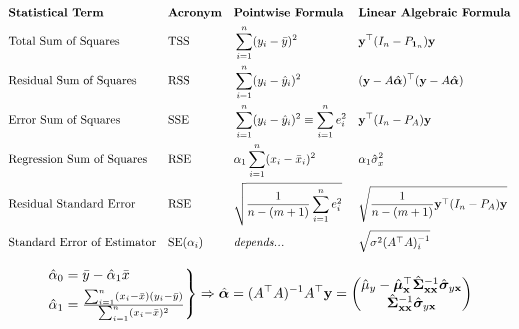 \documentclass[12pt, twoside, draft]{article}
\begin{document}
\begin{align}
& \textbf{Statistical Term} && \textbf{Acronym} && \textbf{Pointwise Formula} && \textbf{Linear Algebraic Formula} \notag\\
&\text{Total Sum of Squares} && \text{TSS} && \sum_{i=1}^n (y_i - \bar{y})^2 && \mathbf{y}^\top (I_n - P_{\mathbf{1}_n}) \mathbf{y} \\
&\text{Residual Sum of Squares} && \text{RSS} && \sum_{i=1}^n (y_i - \hat{y}_i)^2 && (\mathbf{y} - A\hat{\boldsymbol{\alpha}})^\top (\mathbf{y} - A\hat{\boldsymbol{\alpha}}) \\
&\text{Error Sum of Squares} && \text{SSE} && \sum_{i=1}^n (y_i - \hat{y}_i)^2 \equiv \sum_{i=1}^n e^2_i && \mathbf{y}^\top (I_n - P_{A}) \mathbf{y} \\
&\text{Regression Sum of Squares} && \text{RSE} && \alpha_1 \sum_{i=1}^n (x_i - \bar{x}_i)^2  &&  \alpha_1 \hat{\sigma}_x^2 \\
&\text{Residual Standard Error} && \text{RSE} && \sqrt{\frac{1}{n-(m+1)} \sum_{i=1}^n e_i^2 }&&  \sqrt{\frac{1}{n-(m+1)} \mathbf{y}^\top (I_n - P_{A}) \mathbf{y}} \\
&\text{Standard Error of Estimator} && \text{SE}(\alpha_i) && \textit{depends...} &&  \sqrt{\sigma^2 (A^\top A)^{-1}_i}
\end{align}





\begin{equation}
\begin{rcases}
\hat{\alpha}_0 = \bar{y} - \hat{\alpha}_1 \bar{x} \\
\hat{\alpha}_1 = \frac{\sum_{i=1}^n (x_i - \bar{x})(y_i - \bar{y})}{\sum_{i=1}^n (x_i - \bar{x})^2}
\end{rcases} \Rightarrow \hat{\boldsymbol{\alpha}} = (A^\top A)^{-1} A^\top \mathbf{y} = 
\begin{pmatrix}
\hat{\mu}_y - \hat{\boldsymbol{\mu}}^\top_{\mathbf{x}}\hat{\boldsymbol{\Sigma}}_{\mathbf{x}\mathbf{x}}^{-1} \hat{\boldsymbol{\sigma}}_{y\mathbf{x}} \\ \hat{\boldsymbol{\Sigma}}_{\mathbf{x}\mathbf{x}}^{-1} \hat{\boldsymbol{\sigma}}_{y\mathbf{x}}
\end{pmatrix}
\end{equation}
\end{document}
